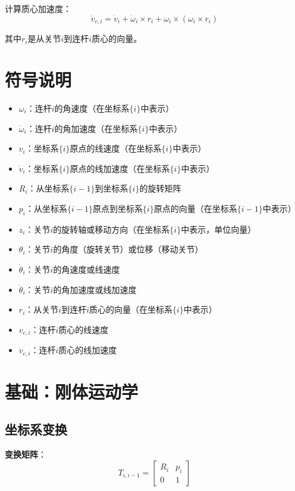 \documentclass[12pt,a4paper]{article}
\begin{document}
计算质心加速度：
\begin{equation}
\dot{v}_{c,i} = \dot{v}_i + \dot{\omega}_i \times r_i + \omega_i \times (\omega_i \times r_i) \tag{23}
\end{equation}

其中$r_i$是从关节$i$到连杆$i$质心的向量。

\section{符号说明}

\begin{itemize}
\item $\omega_i$：连杆$i$的角速度（在坐标系$\{i\}$中表示）
\item $\dot{\omega}_i$：连杆$i$的角加速度（在坐标系$\{i\}$中表示）
\item $v_i$：坐标系$\{i\}$原点的线速度（在坐标系$\{i\}$中表示）
\item $\dot{v}_i$：坐标系$\{i\}$原点的线加速度（在坐标系$\{i\}$中表示）
\item $R_i$：从坐标系$\{i-1\}$到坐标系$\{i\}$的旋转矩阵
\item $p_i$：从坐标系$\{i-1\}$原点到坐标系$\{i\}$原点的向量（在坐标系$\{i-1\}$中表示）
\item $z_i$：关节$i$的旋转轴或移动方向（在坐标系$\{i\}$中表示，单位向量）
\item $\theta_i$：关节$i$的角度（旋转关节）或位移（移动关节）
\item $\dot{\theta}_i$：关节$i$的角速度或线速度
\item $\ddot{\theta}_i$：关节$i$的角加速度或线加速度
\item $r_i$：从关节$i$到连杆$i$质心的向量（在坐标系$\{i\}$中表示）
\item $v_{c,i}$：连杆$i$质心的线速度
\item $\dot{v}_{c,i}$：连杆$i$质心的线加速度
\end{itemize}

\section{基础：刚体运动学}

\subsection{坐标系变换}

\textbf{变换矩阵}：
\begin{equation}
T_{i,i-1} = \begin{bmatrix} R_i & p_i \\ 0 & 1 \end{bmatrix}
\end{equation}
\end{document}

